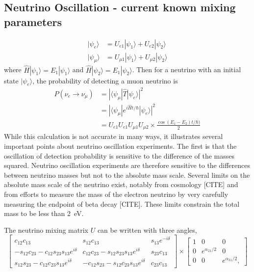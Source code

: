\subsection{Neutrino Oscillation - current known mixing parameters}

\begin{align}
|\psi_e\rangle &= U_{e1}|\psi_1\rangle + U_{e2}|\psi_2\rangle \\
|\psi_{\mu}\rangle &= U_{{\mu}1}|\psi_1\rangle + U_{{\mu}2}|\psi_2\rangle 
\end{align}
where $\hat{H}|\psi_1\rangle = E_1|\psi_1\rangle$ and $\hat{H}|\psi_2\rangle = E_1|\psi_2\rangle$.  Then for a neutrino with an initial state $|\psi_e\rangle$, the probability of detecting a muon neutrino is
\begin{align}
P(\nu_e\rightarrow\nu_{\mu}) &=  |\langle\psi_{\mu}|\hat{T}|\psi_e\rangle|^2 \\
                             &=  |\langle\psi_{\mu}|e^{i\hat{H}t / \hbar}|\psi_e\rangle|^2 \\
                             &=  U_{e1}U_{e1}U_{{\mu}1}U_{{\mu}2} \times \frac{\cos(E_1 - E_2)t/\hbar)}{2} 
\end{align}
While this calculation is not accurate in many ways, it illustrates several important points about neutrino oscillation experiments.  The first is that the oscillation of detection probability is sensitive to the difference of the masses squared.  Neutrino oscillation experiments are therefore sensitive to the differences between neutrino masses but not to the absolute mass scale.  Several limits on the absolute mass scale of the neutrino exist, notably from cosmology [CITE] and from efforts to measure the mass of the electron neutrino by very carefully measuring the endpoint of beta decay [CITE].  These limits constrain the total mass to be less than 2~eV.  

The neutrino mixing matrix $U$ can be written with three angles,
\begin{equation}
\begin{bmatrix}
c_{12}c_{13} & s_{12}c_{13} & s_{13}e^{-i\delta} \\
-s_{12}c_{23}-c_{12}s_{23}s_{13}e^{i\delta} & c_{12}c_{23}-s_{12}s_{23}s_{13}e^{i\delta} & s_{23}c_{13} \\
s_{12}s_{23}-c_{12}c_{23}s_{13}e^{i\delta} & -c_{12}s_{23}-s_{12}c_{23}s_{13}e^{i\delta} & c_{23}c_{13} 
\end{bmatrix}
\times
\begin{bmatrix}
1 & 0 & 0 \\
0 & e^{\alpha_{21} / 2} & 0 \\
0 & 0 & e^{\alpha_{31} / 2},
\end{bmatrix}
\end{equation}

